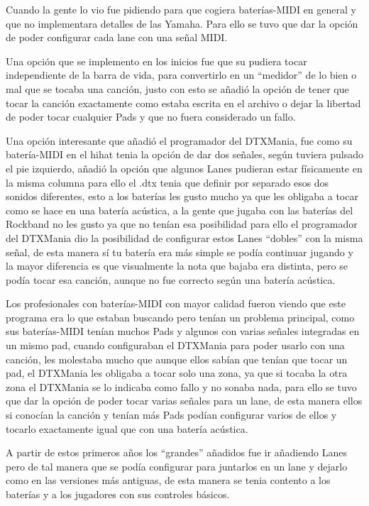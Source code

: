 \documentclass[a4paper,11pt,oneside]{book}
\begin{document}
Cuando la gente lo vio fue pidiendo para que cogiera baterías-MIDI en general y que no implementara detalles de las Yamaha.
Para ello se tuvo que dar la opción de poder configurar cada lane con una señal MIDI.

Una opción que se implemento en los inicios fue que su pudiera tocar independiente de la barra de vida, para convertirlo en un ``medidor'' de lo bien o mal que se tocaba una canción, justo con esto se añadió la opción de tener que tocar la canción exactamente como estaba escrita en el archivo o dejar la libertad de poder tocar cualquier \gls{Pads} y que no fuera considerado un fallo.

Una opción interesante que añadió el programador del DTXMania, fue como su batería-MIDI en el hihat tenia la opción de dar dos señales, según tuviera pulsado el pie izquierdo, añadió la opción que algunos \gls{Lanes} pudieran estar físicamente en la misma columna para ello el .dtx tenia que definir por separado esos dos sonidos diferentes, esto a los baterías les gusto mucho ya que les obligaba a tocar como se hace en una batería acústica, a la gente que jugaba con las baterías del Rockband no les gusto ya que no tenían esa posibilidad para ello el programador del DTXMania dio la posibilidad de configurar estos \gls{Lanes} ``dobles'' con la misma señal, de esta manera sí tu batería era más simple se podía continuar jugando y la mayor diferencia es que visualmente la nota que bajaba era distinta, pero se podía tocar esa canción, aunque no fue correcto según una batería acústica.

Los profesionales con baterías-MIDI con mayor calidad fueron viendo que este programa era lo que estaban buscando pero tenían un problema principal, como sus baterías-MIDI tenían muchos \gls{Pads} y algunos con varias señales integradas en un mismo pad, cuando configuraban el DTXMania para poder usarlo con una canción, les molestaba mucho que aunque ellos sabían que tenían que tocar un pad, el DTXMania les obligaba a tocar solo una zona, ya que si tocaba la otra zona el DTXMania se lo indicaba como fallo y no sonaba nada, para ello se tuvo que dar la opción de poder tocar varias señales para un lane, de esta manera ellos si conocían la canción y tenían más \gls{Pads} podían configurar varios de ellos y tocarlo exactamente igual que con una batería acústica.


A partir de estos primeros años los ``grandes'' añadidos fue ir añadiendo \gls{Lanes} pero de tal manera que se podía configurar para juntarlos en un lane y dejarlo como en las versiones más antiguas, de esta manera se tenia contento a los baterías y a los jugadores con sus controles básicos.
\end{document}
